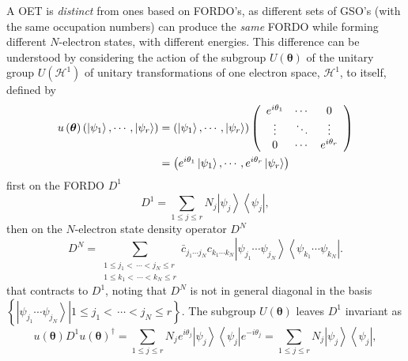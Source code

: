 \documentclass[aps,preprint]{revtex4}%
\begin{document}
A OET is \emph{distinct} from ones based on FORDO's, as different sets of
GSO's (with the same occupation numbers) can produce the \emph{same} FORDO
while forming different $N$-electron states, with different energies.  This
difference can be understood by considering the action of the subgroup
$U\left(  \boldsymbol{\theta}\right)  $ of the unitary group $U\left(
\mathcal{H}^{1}\right)  $ of unitary transformations of one electron space,
$\mathcal{H}^{1}$, to itself, defined by
\begin{align}
u\left(  \boldsymbol{\theta}\right)  \left(  \left\vert \psi_{1}\right\rangle
,\cdots,\left\vert \psi_{r}\right\rangle \right)   &  =\left(  \left\vert
\psi_{1}\right\rangle ,\cdots,\left\vert \psi_{r}\right\rangle \right)
\left(
\begin{array}
[c]{ccc}%
e^{i\theta_{1}} & \cdots & 0\\
\vdots & \ddots & \vdots\\
0 & \cdots & e^{i\theta_{r}}%
\end{array}
\right)  \nonumber\\
&  =\left(  e^{i\theta_{1}}\left\vert \psi_{1}\right\rangle ,\cdots
,e^{i\theta_{r}}\left\vert \psi_{r}\right\rangle \right)
\end{align}
first on the FORDO $D^{1}$
\begin{equation}
D^{1}=\sum_{1\leq j\leq r}N_{j}\left\vert \psi_{j}\right\rangle \left\langle
\psi_{j}\right\vert ,
\end{equation}
then on the $N$-electron state density operator $D^{N}$
\begin{equation}
D^{N}=\sum_{\substack{1\leq j_{1}<\,\cdots<j_{N}\leq r\\1\leq k_{1}%
<\,\cdots<k_{N}\leq r}}\bar{c}_{j_{1}\cdots j_{N}}c_{k_{1}\cdots k_{N}%
}\left\vert \psi_{j_{1}}\cdots\psi_{j_{N}}\right\rangle \left\langle
\psi_{k_{1}}\cdots\psi_{k_{N}}\right\vert .
\end{equation}
that contracts to $D^{1}$, noting that $D^{N}$ is not in general diagonal in
the basis $\left\{  \left.  \left\vert \psi_{j_{1}}\cdots\psi_{j_{N}%
}\right\rangle \right\vert 1\leq j_{1}<\,\cdots<j_{N}\leq r\right\}  $. The
subgroup $U\left(  \boldsymbol{\theta}\right)  $ leaves $D^{1}$ invariant as
\begin{equation}
u\left(  \boldsymbol{\theta}\right)  D^{1}u\left(  \boldsymbol{\theta}\right)
^{\dagger}=\sum_{1\leq j\leq r}N_{j}e^{i\theta_{j}}\left\vert \psi
_{j}\right\rangle \left\langle \psi_{j}\right\vert e^{-i\theta_{j}}%
=\sum_{1\leq j\leq r}N_{j}\left\vert \psi_{j}\right\rangle \left\langle
\psi_{j}\right\vert ,
\end{equation}
\end{document}
